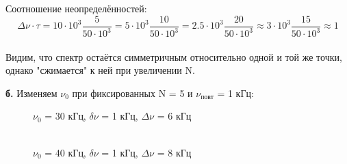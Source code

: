 \documentclass[a4paper,12pt]{article}
\begin{document}
\begin{enumerate}
Соотношение неопределённостей:
$$ \Delta \nu \cdot \tau = 10\cdot10^3\frac{5}{50\cdot10^3} = 5\cdot10^3\frac{10}{50\cdot10^3} = 2.5\cdot10^3\frac{20}{50\cdot10^3} \approx 3\cdot10^3\frac{15}{50\cdot10^3} \approx 1 $$\\

Видим, что спектр остаётся симметричным относительно одной и той же точки, однако "сжимается" к ней при увеличении N.


\newpage

\textbf{б.} Изменяем $\nu_0$ при фиксированных N = 5 и $\nu_\text{повт}$ = 1 кГц:

\begin{figure}[h]
\begin{minipage}[h]{0.47\linewidth}
 $\nu_0$ = 30 кГц, $\delta \nu$ = 1 кГц, $\Delta \nu$ = 6 кГц  \\
\end{minipage}
\hfill
\begin{minipage}[h]{0.47\linewidth}
 \\ $\nu_0$ = 40 кГц, $\delta \nu$ = 1 кГц, $\Delta \nu$ = 8 кГц

\end{minipage}
\end{figure}
\end{enumerate}
\end{document}
